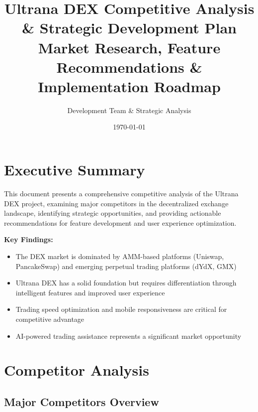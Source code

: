 \documentclass{article}
\title{\textbf{Ultrana DEX Competitive Analysis \& Strategic Development Plan}\\\large Market Research, Feature Recommendations \& Implementation Roadmap}
\author{Development Team \& Strategic Analysis}
\date{\today}
\begin{document}
\maketitle

\tableofcontents
\newpage

\section{Executive Summary}

This document presents a comprehensive competitive analysis of the Ultrana DEX project, examining major competitors in the decentralized exchange landscape, identifying strategic opportunities, and providing actionable recommendations for feature development and user experience optimization.

\textbf{Key Findings:}
\begin{itemize}[leftmargin=*]
    \item The DEX market is dominated by AMM-based platforms (Uniswap, PancakeSwap) and emerging perpetual trading platforms (dYdX, GMX)
    \item Ultrana DEX has a solid foundation but requires differentiation through intelligent features and improved user experience
    \item Trading speed optimization and mobile responsiveness are critical for competitive advantage
    \item AI-powered trading assistance represents a significant market opportunity
\end{itemize}

\section{Competitor Analysis}

\subsection{Major Competitors Overview}
\end{document}
